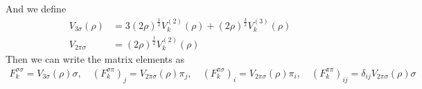 \documentclass[UTF8]{article}
\begin{document}
And we define
\begin{equation}
\begin{split}
V_{3\sigma}(\rho)&=3(2\rho)^{\frac{1}{2}}V^{(2)}_k(\rho)+(2\rho)^{\frac{3}{2}}V^{(3)}_k(\rho)\\
V_{2\pi\sigma}&=(2\rho)^{\frac{1}{2}}V^{(2)}_k(\rho)
\end{split}
\end{equation}
Then we can write the matrix elements as
\begin{equation}
\begin{split}
F^{\sigma\sigma}_k=V_{3\sigma}(\rho)\sigma,\quad (F^{\sigma\pi}_k)_j=V_{2\pi\sigma}(\rho)\pi_j,\quad (F^{\pi\sigma}_k)_i=V_{2\pi\sigma}(\rho)\pi_i,\quad (F^{\pi\pi}_k)_{ij}=\delta_{ij}V_{2\pi\sigma}(\rho)\sigma
\end{split}
\end{equation}
\end{document}
